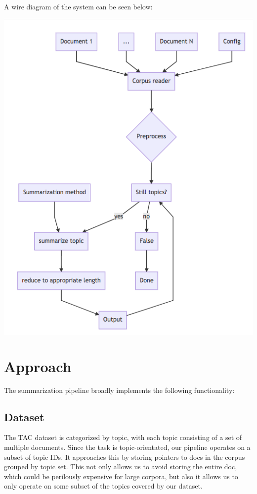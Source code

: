 \documentclass[11pt]{article}
\begin{document}
A wire diagram of the system can be seen below:

\includegraphics[scale=0.4]{pipeline}


\section{Approach}
The summarization pipeline broadly implements the following functionality:
\subsection{Dataset}
The TAC dataset is categorized by topic, with each topic consisting of a set of multiple documents. Since the task is topic-orientated, our pipeline operates on a subset of topic IDs. It approaches this by storing pointers to docs in the corpus grouped by topic set. This not only allows us to avoid storing the entire doc, which could be perilously expensive for large corpora, but also it allows us to only operate on some subset of the topics covered by our dataset.
\end{document}
